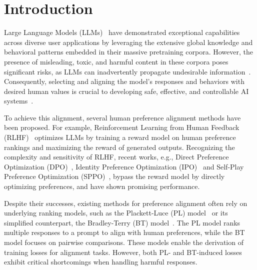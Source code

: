 \section{Introduction}
\label{sec:intro}
 Large Language Models (LLMs)~\cite{gpt4,llama,palm,chatglm} have demonstrated exceptional capabilities across diverse user applications by leveraging the extensive global knowledge and behavioral patterns embedded in their massive pretraining corpora. However, the presence of misleading, toxic, and harmful content in these corpora poses significant risks, as LLMs can inadvertently propagate undesirable information~\cite{bai2022constitutional, yao2024survey}. Consequently, selecting and aligning the model's responses and behaviors with desired human values is crucial to developing safe, effective, and controllable AI systems~\cite{christiano2017deep, stiennon2020learning, ouyang2022training, dai2023safe}.

To achieve this alignment, several human preference alignment methods have been proposed. For example, Reinforcement Learning from Human Feedback (RLHF)~\cite{ppo, christiano2017deep} optimizes LLMs by training a reward model on human preference rankings and maximizing the reward of generated outputs. Recognizing the complexity and sensitivity of RLHF, recent works, e.g., Direct Preference Optimization (DPO)~\cite{dpo}, Identity Preference Optimization (IPO)~\cite{ipo} and Self-Play Preference Optimization (SPPO)~\cite{sppo}, bypass the reward model by directly optimizing preferences, and have shown promising performance.
 
Despite their successes, existing methods for preference alignment often rely on underlying ranking models, such as the Plackett-Luce (PL) model~\cite{PL1, PL2} or its simplified counterpart, the Bradley-Terry (BT) model~\cite{BT}. The PL model ranks multiple responses to a prompt to align with human preferences, while the BT model focuses on pairwise comparisons. These models enable the derivation of training losses for alignment tasks. However, both PL- and BT-induced losses exhibit critical shortcomings when handling harmful responses.



